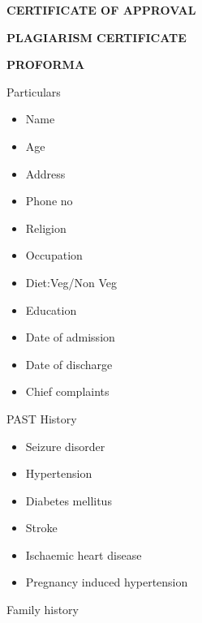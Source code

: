 \documentclass[14pt]{extarticle}
\begin{document}
\clearpage

\thispagestyle{empty}


\clearpage

\begin{center}
    \textbf{CERTIFICATE OF APPROVAL}
\end{center}

%
\clearpage

\textbf{PLAGIARISM CERTIFICATE}

\newpage

\textbf{PROFORMA}

Particulars

\begin{itemize}
    \item Name
    \item Age
    \item Address
    \item Phone no
    \item Religion
    \item Occupation
    \item Diet:Veg/Non Veg
    \item Education
    \item Date of admission
    \item Date of discharge
    \item Chief complaints
\end{itemize}

PAST History

\begin{itemize}
\item  Seizure disorder
\item  Hypertension
\item  Diabetes mellitus
\item  Stroke
\item  Ischaemic heart disease
\item  Pregnancy induced hypertension
\end{itemize}	

Family history
\end{document}
